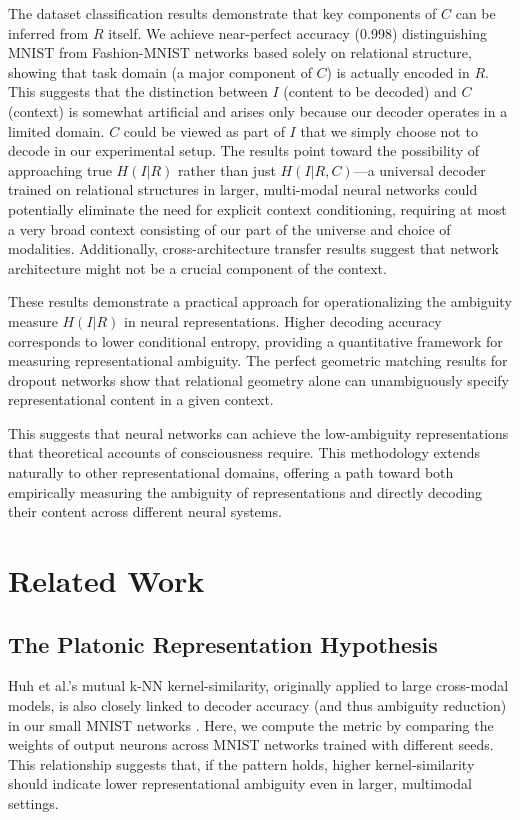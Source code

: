 \documentclass[11pt]{article}
\begin{document}
The dataset classification results demonstrate that key components of $C$ can be inferred from $R$ itself. We achieve near-perfect accuracy (0.998) distinguishing MNIST from Fashion-MNIST networks based solely on relational structure, showing that task domain (a major component of $C$) is actually encoded in $R$. This suggests that the distinction between $I$ (content to be decoded) and $C$ (context) is somewhat artificial and arises only because our decoder operates in a limited domain. $C$ could be viewed as part of $I$ that we simply choose not to decode in our experimental setup. The results point toward the possibility of approaching true $H(I|R)$ rather than just $H(I|R,C)$—a universal decoder trained on relational structures in larger, multi-modal neural networks could potentially eliminate the need for explicit context conditioning, requiring at most a very broad context consisting of our part of the universe and choice of modalities. Additionally, cross-architecture transfer results suggest that network architecture might not be a crucial component of the context.

These results demonstrate a practical approach for operationalizing the ambiguity measure $H(I|R)$ in neural representations. Higher decoding accuracy corresponds to lower conditional entropy, providing a quantitative framework for measuring representational ambiguity. The perfect geometric matching results for dropout networks show that relational geometry alone can unambiguously specify representational content in a given context.

This suggests that neural networks can achieve the low-ambiguity representations that theoretical accounts of consciousness require. This methodology extends naturally to other representational domains, offering a path toward both empirically measuring the ambiguity of representations and directly decoding their content across different neural systems.

\section{Related Work}

\subsection{The Platonic Representation Hypothesis}

Huh et al.'s mutual k-NN kernel-similarity, originally applied to large cross-modal models, is also closely linked to decoder accuracy (and thus ambiguity reduction) in our small MNIST networks \cite{huh2024}. Here, we compute the metric by comparing the weights of output neurons across MNIST networks trained with different seeds. This relationship suggests that, if the pattern holds, higher kernel-similarity should indicate lower representational ambiguity even in larger, multimodal settings.
\end{document}
